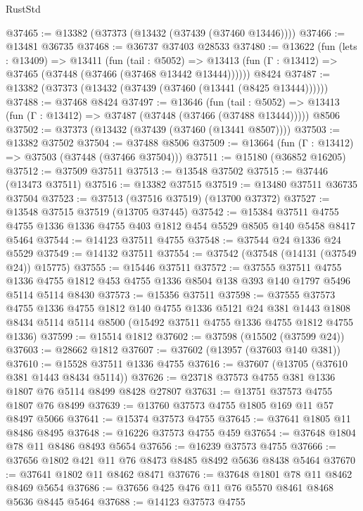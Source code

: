 \begin{lexlean}{RustStd}
\begin{coremodule}
@37465 := @13382 (@37373 (@13432 (@37439 (@37460 @13446))))
@37466 := @13481 @36735
@37468 := @36737 @37403 @28533
@37480 := @13622
    (fun (lets : @13409) =>
    @13411
      (fun (tail : @5052) =>
      @13413 (fun (Γ : @13412) => @37465 (@37448 (@37466 (@37468 @13442 @13444))))))
    @8424
@37487 := @13382 (@37373 (@13432 (@37439 (@37460 (@13441 (@8425 @13444))))))
@37488 := @37468 @8424
@37497 := @13646
    (fun (tail : @5052) => @13413 (fun (Γ : @13412) => @37487 (@37448 (@37466 (@37488 @13444)))))
    @8506
@37502 := @37373 (@13432 (@37439 (@37460 (@13441 @8507))))
@37503 := @13382 @37502
@37504 := @37488 @8506
@37509 := @13664 (fun (Γ : @13412) => @37503 (@37448 (@37466 @37504)))
@37511 := @15180 (@36852 @16205)
@37512 := @37509 @37511
@37513 := @13548 @37502
@37515 := @37446 (@13473 @37511)
@37516 := @13382 @37515
@37519 := @13480 @37511 @36735 @37504
@37523 := @37513 (@37516 @37519) (@13700 @37372)
@37527 := @13548 @37515 @37519 (@13705 @37445)
@37542 := @15384
    @37511
    @4755
    @4755
    @1336
    @1336
    @4755
    @403
    @1812
    @454
    @5529
    @8505
    @140
    @5458
    @8417
    @5464
@37544 := @14123 @37511 @4755
@37548 := @37544 @24 @1336 @24 @5529
@37549 := @14132 @37511
@37554 := @37542 (@37548 (@14131 (@37549 @24)) @15775)
@37555 := @15446 @37511
@37572 := @37555
    @37511
    @4755
    @1336
    @4755
    @1812
    @453
    @4755
    @1336
    @8504
    @138
    @393
    @140
    @1797
    @5496
    @5114
    @5114
    @8430
@37573 := @15356 @37511
@37598 := @37555
    @37573
    @4755
    @1336
    @4755
    @1812
    @140
    @4755
    @1336
    @5121
    @24
    @381
    @1443
    @1808
    @8434
    @5114
    @5114
    @8500
    (@15492 @37511 @4755 @1336 @4755 @1812 @4755 @1336)
@37599 := @15514 @1812
@37602 := @37598 (@15502 (@37599 @24))
@37603 := @28662 @1812
@37607 := @37602 (@13957 (@37603 @140 @381))
@37610 := @15528 @37511 @1336 @4755
@37616 := @37607 (@13705 (@37610 @381 @1443 @8434 @5114))
@37626 := @23718 @37573 @4755 @381 @1336 @1807 @76 @5114 @8499 @8428 @27807
@37631 := @13751 @37573 @4755 @1807 @76 @8499
@37639 := @13760 @37573 @4755 @1805 @169 @11 @57 @8497 @5066
@37641 := @15374 @37573 @4755
@37645 := @37641 @1805 @11 @8486 @8495
@37648 := @16226 @37573 @4755 @459
@37654 := @37648 @1804 @78 @11 @8486 @8493 @5654
@37656 := @16239 @37573 @4755
@37666 := @37656 @1802 @421 @11 @76 @8473 @8485 @8492 @5636 @8438 @5464
@37670 := @37641 @1802 @11 @8462 @8471
@37676 := @37648 @1801 @78 @11 @8462 @8469 @5654
@37686 := @37656 @425 @476 @11 @76 @5570 @8461 @8468 @5636 @8445 @5464
@37688 := @14123 @37573 @4755

\end{coremodule}
\end{lexlean}
